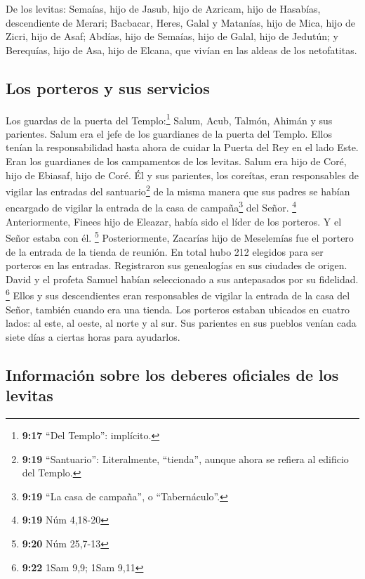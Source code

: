  De los levitas: Semaías, hijo de Jasub, hijo de Azricam,
hijo de Hasabías, descendiente de Merari;  Bacbacar,
Heres, Galal y Matanías, hijo de Mica, hijo de Zicri, hijo de Asaf;
 Abdías, hijo de Semaías, hijo de Galal, hijo de Jedutún;
y Berequías, hijo de Asa, hijo de Elcana, que vivían en las aldeas de
los netofatitas.

\hypertarget{los-porteros-y-sus-servicios}{%
\subsection{Los porteros y sus
servicios}\label{los-porteros-y-sus-servicios}}

 Los guardas de la puerta del Templo:\footnote{\textbf{9:17}
  ``Del Templo'': implícito.} Salum, Acub, Talmón, Ahimán y sus
parientes. Salum era el jefe de los guardianes de la puerta del Templo.
 Ellos tenían la responsabilidad hasta ahora de cuidar la
Puerta del Rey en el lado Este. Eran los guardianes de los campamentos
de los levitas.  Salum era hijo de Coré, hijo de Ebiasaf,
hijo de Coré. Él y sus parientes, los coreítas, eran responsables de
vigilar las entradas del santuario\footnote{\textbf{9:19} ``Santuario'':
  Literalmente, ``tienda'', aunque ahora se refiera al edificio del
  Templo.} de la misma manera que sus padres se habían encargado de
vigilar la entrada de la casa de campaña\footnote{\textbf{9:19} ``La
  casa de campaña'', o ``Tabernáculo''.} del Señor. \footnote{\textbf{9:19}
  Núm 4,18-20}  Anteriormente, Finees hijo de Eleazar,
había sido el líder de los porteros. Y el Señor estaba con él.
\footnote{\textbf{9:20} Núm 25,7-13}  Posteriormente,
Zacarías hijo de Meselemías fue el portero de la entrada de la tienda de
reunión.  En total hubo 212 elegidos para ser porteros en
las entradas. Registraron sus genealogías en sus ciudades de origen.
David y el profeta Samuel habían seleccionado a sus antepasados por su
fidelidad. \footnote{\textbf{9:22} 1Sam 9,9; 1Sam 9,11} 
Ellos y sus descendientes eran responsables de vigilar la entrada de la
casa del Señor, también cuando era una tienda.  Los
porteros estaban ubicados en cuatro lados: al este, al oeste, al norte y
al sur.  Sus parientes en sus pueblos venían cada siete
días a ciertas horas para ayudarlos.

\hypertarget{informaciuxf3n-sobre-los-deberes-oficiales-de-los-levitas}{%
\subsection{Información sobre los deberes oficiales de los
levitas}\label{informaciuxf3n-sobre-los-deberes-oficiales-de-los-levitas}}

